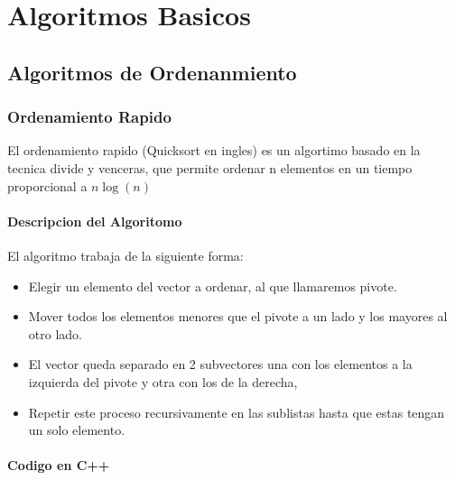 
\chapter{Algoritmos Basicos}
\renewcommand{\chaptername}{Lecture}
\setlength{\parindent}{0pt}
\section{Algoritmos de Ordenanmiento}
\subsection{Ordenamiento Rapido}

El ordenamiento rapido (Quicksort en ingles) es un algortimo basado en la tecnica divide y venceras, que permite ordenar n elementos en un tiempo proporcional a $ n \log (n) $

\subsubsection{Descripcion del Algoritomo}

El algoritmo trabaja de la siguiente forma:

\begin{itemize}
\item Elegir un elemento del vector a ordenar, al que llamaremos pivote.

\item Mover todos los elementos menores que el pivote a un lado y los mayores al otro lado.

\item El vector queda separado en 2 subvectores una con los elementos a la izquierda del pivote y otra con los de la derecha,

\item Repetir este proceso recursivamente en las sublistas hasta que estas tengan un solo elemento.
\end{itemize}

\subsubsection{Codigo en C++}

